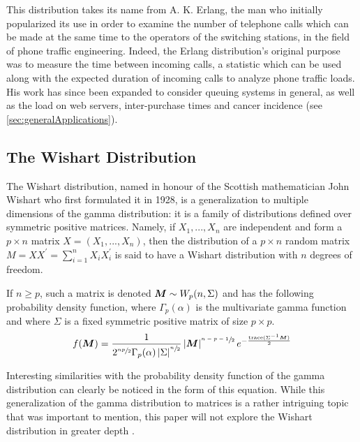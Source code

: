 \documentclass[12pt]{article}
\begin{document}
This distribution takes its name from A. K. Erlang, the man who initially popularized its use in order to examine the
number of telephone calls which can be made at the same time to the operators of the switching stations, in the field of
phone traffic engineering. Indeed, the Erlang distribution's original purpose was to measure the time between incoming
calls, a statistic which can be used along with the expected duration of incoming calls to analyze phone traffic loads.
His work has since been expanded to consider queuing systems in general, as well as the load on web servers,
inter-purchase times and cancer incidence (see \autoref{sec:generalApplications})\cite{zachWhatErlangDistribution2020}.


\pagebreak
\subsection{The Wishart Distribution}
The Wishart distribution, named in honour of the Scottish mathematician John Wishart who first formulated it in 1928, is
a generalization to multiple dimensions of the gamma distribution: it is a family of distributions defined over symmetric
positive matrices. Namely, if $X_1, ..., X_n$ are independent and form a $p\times n$ matrix $X = (X_1, ..., X_n)$, then
the distribution of a $p\times n$ random matrix $M = XX^\prime = \sum^n_{i=1}X_iX^\prime_i$ is said to have a Wishart
distribution with $n$ degrees of freedom.

If $n\geq p$, such a matrix is denoted $\bm{M}\sim W_p(n, \Sigma)$ and has the following probability density function,
where $\Gamma_p(\alpha)$ is the multivariate gamma function and where $\Sigma$ is a fixed symmetric positive matrix of
size $p \times p$.
\begin{equation}
	f(\bm{M}) = \frac{1}{2^{\sfrac{np}{2}}\Gamma_p(\alpha)\left|\Sigma\right|^{\sfrac{n}{2}}}\left|\bm{M}\right|^{\sfrac{n-p-1}{2}}e^{-\frac{\text{trace}(\Sigma^{-1}\bm{M})}{2}}
\end{equation}

Interesting similarities with the probability density function of the gamma distribution can clearly be noticed in the
form of this equation. While this generalization of the gamma distribution to matrices is a rather intriguing topic that
was important to mention, this paper will not explore the Wishart distribution in greater depth
\cite{wikipediaWishartDistribution2022}.
\end{document}
